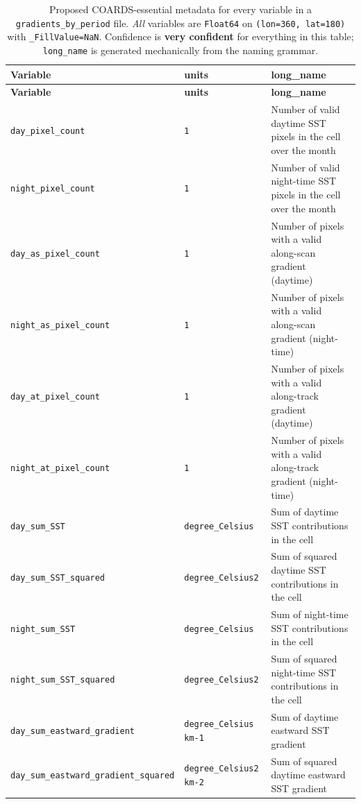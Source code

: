 \documentclass[11pt]{article}
\newcommand{\vc}{\textbf{very confident}}
\begin{document}
\footnotesize
\begin{longtable}{@{}L{5.9cm} L{3.4cm} L{6.9cm}@{}}
\caption{Proposed COARDS-essential metadata for every variable in a
\texttt{gradients\_by\_period} file. \emph{All} variables are
\texttt{Float64} on \texttt{(lon=360, lat=180)} with
\texttt{\_FillValue=NaN}. Confidence is \vc{} for everything in
this table; \texttt{long\_name} is generated mechanically from the
naming grammar.}\label{tab:longnames}\\
\toprule
\textbf{Variable} & \textbf{units} & \textbf{long\_name} \\
\midrule
\endfirsthead
\toprule
\textbf{Variable} & \textbf{units} & \textbf{long\_name} \\
\midrule
\endhead

\texttt{day\_pixel\_count}      & \texttt{1} & Number of valid daytime SST pixels in the cell over the month \\
\texttt{night\_pixel\_count}    & \texttt{1} & Number of valid night-time SST pixels in the cell over the month \\
\texttt{day\_as\_pixel\_count}  & \texttt{1} & Number of pixels with a valid along-scan gradient (daytime) \\
\texttt{night\_as\_pixel\_count}& \texttt{1} & Number of pixels with a valid along-scan gradient (night-time) \\
\texttt{day\_at\_pixel\_count}  & \texttt{1} & Number of pixels with a valid along-track gradient (daytime) \\
\texttt{night\_at\_pixel\_count}& \texttt{1} & Number of pixels with a valid along-track gradient (night-time) \\
\midrule
\texttt{day\_sum\_SST}                  & \texttt{degree\_Celsius}  & Sum of daytime SST contributions in the cell \\
\texttt{day\_sum\_SST\_squared}         & \texttt{degree\_Celsius2} & Sum of squared daytime SST contributions in the cell \\
\texttt{night\_sum\_SST}                & \texttt{degree\_Celsius}  & Sum of night-time SST contributions in the cell \\
\texttt{night\_sum\_SST\_squared}       & \texttt{degree\_Celsius2} & Sum of squared night-time SST contributions in the cell \\
\midrule
\texttt{day\_sum\_eastward\_gradient}            & \texttt{degree\_Celsius km-1} & Sum of daytime eastward SST gradient \\
\texttt{day\_sum\_eastward\_gradient\_squared}   & \texttt{degree\_Celsius2 km-2} & Sum of squared daytime eastward SST gradient \\

\end{longtable}
\end{document}
